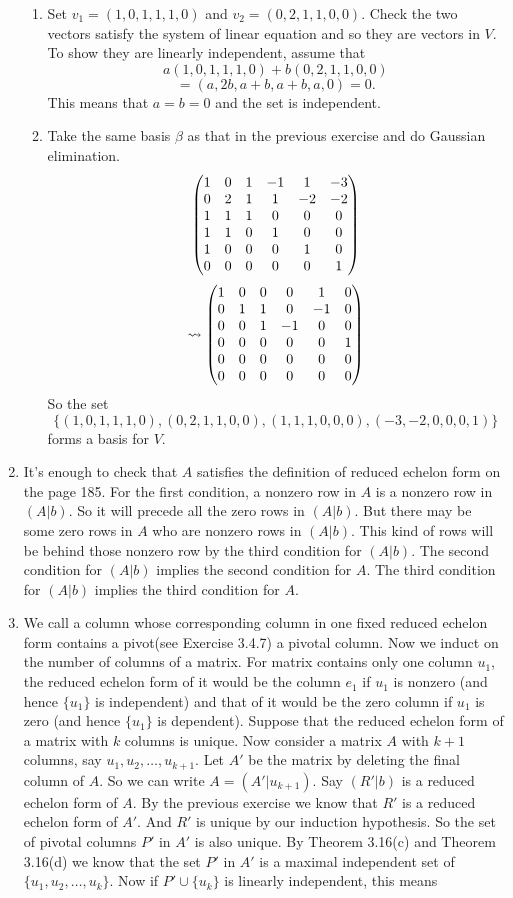 \begin{enumerate}
\begin{enumerate}
\item Set $v_1=(1,0,1,1,1,0)$ and $v_2=(0,2,1,1,0,0)$. Check the two vectors satisfy the system of linear equation and so they are vectors in $V$. To show they are linearly independent, assume that 
\[a(1,0,1,1,1,0)+b(0,2,1,1,0,0)\]
\[=(a,2b,a+b,a+b,a,0)=0.\]
This means that $a=b=0$ and the set is independent.
\item Take the same basis $\beta $ as that in the previous exercise and do Gaussian elimination.
\[\begin{pmatrix}1 & 0 & 1 & -1 & 1 & -3\cr 0 & 2 & 1 & 1 & -2 & -2\cr 1 & 1 & 1 & 0 & 0 & 0\cr 1 & 1 & 0 & 1 & 0 & 0\cr 1 & 0 & 0 & 0 & 1 & 0\cr 0 & 0 & 0 & 0 & 0 & 1\end{pmatrix}\]
\[\rightsquigarrow \begin{pmatrix}1 & 0 & 0 & 0 & 1 & 0\cr 0 & 1 & 1 & 0 & -1 & 0\cr 0 & 0 & 1 & -1 & 0 & 0\cr 0 & 0 & 0 & 0 & 0 & 1\cr 0 & 0 & 0 & 0 & 0 & 0\cr 0 & 0 & 0 & 0 & 0 & 0\end{pmatrix}\]
So the set 
\[\{(1,0,1,1,1,0),(0,2,1,1,0,0),(1,1,1,0,0,0),(-3,-2,0,0,0,1)\}\]
forms a basis for $V$.
\end{enumerate}
\item It's enough to check that $A$ satisfies the definition of reduced echelon form on the page 185. For the first condition, a nonzero row in $A$ is a nonzero row in $(A|b)$. So it will precede all the zero rows in $(A|b)$. But there may be some zero rows in $A$ who are nonzero rows in $(A|b)$. This kind of rows will be behind those nonzero row by the third condition for $(A|b)$. The second condition for $(A|b)$ implies the second condition for $A$. The third condition for $(A|b)$ implies the third condition for $A$.
\item We call a column whose corresponding column in one fixed reduced echelon form contains a pivot(see Exercise 3.4.7) a pivotal column. Now we induct on the number of columns of a matrix. For matrix contains only one column $u_1$, the reduced echelon form of it would be the column $e_1$ if $u_1$ is nonzero (and hence $\{u_1\}$ is independent) and that of it would be the zero column if $u_1$ is zero (and hence $\{u_1\}$ is dependent). Suppose that the reduced echelon form of a matrix with $k$ columns is unique. Now consider a matrix $A$ with $k+1$ columns, say $u_1,u_2,\ldots ,u_{k+1}$. Let $A'$ be the matrix by deleting the final column of $A$. So we can write $A=(A'|u_{k+1})$. Say $(R'|b)$ is a reduced echelon form of $A$. By the previous exercise we know that $R'$ is a reduced echelon form of $A'$. And $R'$ is unique by our induction hypothesis. So the set of pivotal columns $P'$ in $A'$ is also unique. By Theorem 3.16(c) and Theorem 3.16(d) we know that the set $P'$ in $A'$ is a maximal independent set of $\{u_1,u_2,\ldots ,u_k\}$. Now if $P'\cup\{u_k\}$ is linearly independent, this means 

\end{enumerate}
